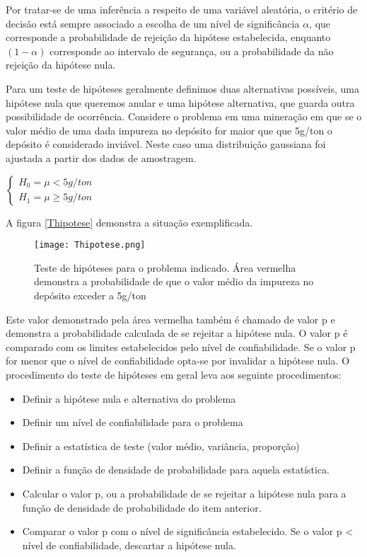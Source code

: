 Por tratar-se de uma inferência a respeito de uma variável aleatória, o critério de decisão está sempre associado a escolha de um nível de significância $\alpha$, que corresponde a probabilidade de rejeição da hipótese estabelecida, enquanto $(1-\alpha)$ corresponde ao intervalo de segurança, ou a probabilidade da não rejeição da hipótese nula.   

Para um teste de hipóteses geralmente definimos duas alternativas possíveis, uma hipótese nula que queremos anular e uma hipótese alternativa, que guarda outra possibilidade de ocorrência. Considere o problema em uma mineração em que se o valor médio de uma dada impureza no depósito for maior que que 5g/ton o depósito é considerado inviável. Neste caso uma distribuição gaussiana foi ajustada a partir dos dados de amostragem. 

$\left\{\begin{matrix}

 	H_{0} = \mu <  5g/ton \\ 
 	H_{1} = \mu \geqslant 5g/ton
 	
\end{matrix}\right.$

A figura \eqref{Thipotese} demonstra a situação exemplificada.

\begin{figure}[H]
  	\centering
  	\texttt{[image: Thipotese.png]}	
  	\caption{Teste de hipóteses para o problema indicado. Área vermelha demonstra a probabilidade de que o valor médio da impureza no depósito exceder a 5g/ton  }
  	\label{Thipotese}
\end{figure}


Este valor demonstrado pela área vermelha também é chamado de valor p e demonstra a probabilidade calculada de se rejeitar a hipótese nula. O valor p é comparado com os limites estabelecidos pelo nível de confiabilidade. Se o valor p for menor que o nível de confiabilidade opta-se por invalidar a hipótese nula. O procedimento do teste de hipóteses em geral leva aos seguinte procedimentos:

\begin{itemize}
	\item Definir a hipótese nula e alternativa do problema
	\item Definir um nível de confiabilidade para o problema
	\item Definir a estatística de teste (valor médio, variância, proporção)
	\item Definir a função de densidade de probabilidade para aquela estatística.
	\item Calcular o valor p, ou a probabilidade de se rejeitar a hipótese nula para a função de densidade de probabilidade do item anterior.
	\item Comparar o valor p com o nível de significância estabelecido. Se o valor p < nível de confiabilidade, descartar a hipótese nula.
\end{itemize} 


